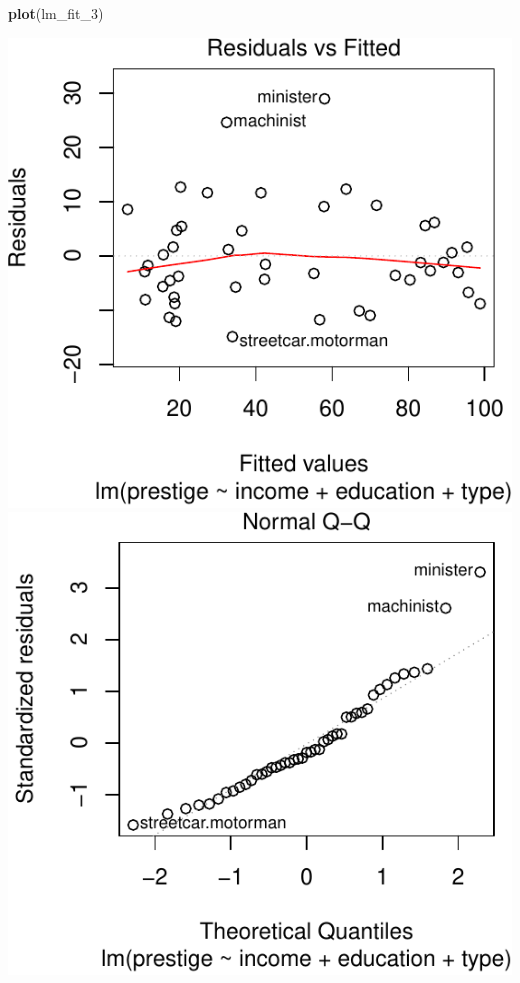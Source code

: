 \documentclass[]{extarticle}
\newenvironment{Shaded}{\begin{snugshade}}{\end{snugshade}}
\newcommand{\KeywordTok}[1]{\textcolor[rgb]{0.13,0.29,0.53}{\textbf{#1}}}
\newcommand{\DecValTok}[1]{\textcolor[rgb]{0.00,0.00,0.81}{#1}}
\newcommand{\NormalTok}[1]{#1}
\begin{document}
\begin{Shaded}
\begin{Highlighting}[]
\KeywordTok{plot}\NormalTok{(lm_fit_}\DecValTok{3}\NormalTok{)}
\end{Highlighting}
\end{Shaded}

\includegraphics{20190417_avPlots_files/figure-latex/unnamed-chunk-15-1.pdf}
\includegraphics{20190417_avPlots_files/figure-latex/unnamed-chunk-15-2.pdf}
\end{document}
